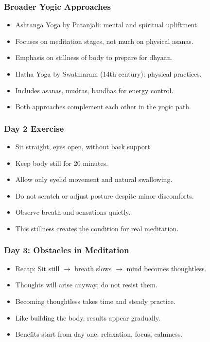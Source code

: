 \begin{frame}[fragile]\frametitle{Broader Yogic Approaches}
      \begin{itemize}
        \item Ashtanga Yoga by Patanjali: mental and spiritual upliftment.
        \item Focuses on meditation stages, not much on physical asanas.
        \item Emphasis on stillness of body to prepare for dhyaan.
        \item Hatha Yoga by Swatmaram (14th century): physical practices.
        \item Includes asanas, mudras, bandhas for energy control.
        \item Both approaches complement each other in the yogic path.
      \end{itemize}
\end{frame}

\begin{frame}[fragile]\frametitle{Day 2 Exercise}
      \begin{itemize}
        \item Sit straight, eyes open, without back support.
        \item Keep body still for 20 minutes.
        \item Allow only eyelid movement and natural swallowing.
        \item Do not scratch or adjust posture despite minor discomforts.
        \item Observe breath and sensations quietly.
        \item This stillness creates the condition for real meditation.
      \end{itemize}
\end{frame}


\begin{frame}[fragile]\frametitle{Day 3: Obstacles in Meditation}
      \begin{itemize}
        \item Recap: Sit still $\rightarrow$ breath slows $\rightarrow$ mind becomes thoughtless.
        \item Thoughts will arise anyway; do not resist them.
        \item Becoming thoughtless takes time and steady practice.
        \item Like building the body, results appear gradually.
        \item Benefits start from day one: relaxation, focus, calmness.
      \end{itemize}
\end{frame}

